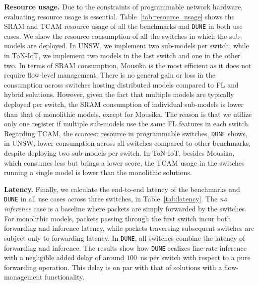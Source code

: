 \documentclass[journal]{IEEEtran}
\theoremstyle{plain} %
\newcommand{\name}{\texttt{\fontsize{9}{11}\selectfont DUNE}\xspace}
\begin{document}
\textbf{Resource usage.} Due to the constraints of programmable network hardware, evaluating resource usage is essential. Table~\ref{tab:resource_usage} shows the SRAM and TCAM resource usage of all the benchmarks and \name in both use cases. 
We show the resource consumption of all the switches in which the sub-models are deployed. In UNSW, we implement two sub-models per switch, while in ToN-IoT, we implement two models in the last switch and one in the other two. In terms of SRAM consumption, Mousika is the most efficient as it does not require flow-level management. There is no general gain or loss in the consumption across switches hosting distributed models compared to FL and hybrid solutions. However, given the fact that multiple models are typically deployed per switch, the SRAM consumption of individual sub-models is lower than that of monolithic models, except for Mousika. The reason is that we utilize only one register if multiple sub-models use the same FL features in each switch.
Regarding TCAM, the scarcest resource in programmable switches, \name shows, in UNSW, lower consumption across all switches compared to other benchmarks, despite deploying two sub-models per switch. In ToN-IoT, besides Mousika, which consumes less but brings a lower score, the TCAM usage in the switches running a single model is lower than the monolithic solutions.

\textbf{Latency.} Finally, we calculate the end-to-end latency of the benchmarks and \name in all use cases across three switches, in Table~\ref{tab:latency}.
The \textit{no inference} case is a baseline where packets are simply forwarded by the switches.
For monolithic models, packets passing through the first switch incur both forwarding and inference latency, while packets traversing subsequent switches are subject only to forwarding latency. In \name, all switches combine the latency of forwarding and inference.
The results show how \name realizes line-rate inference with a negligible added delay of around $100$~ns per switch with respect to a pure forwarding operation. This delay is on par with that of solutions with a flow-management functionality.

\end{document}

